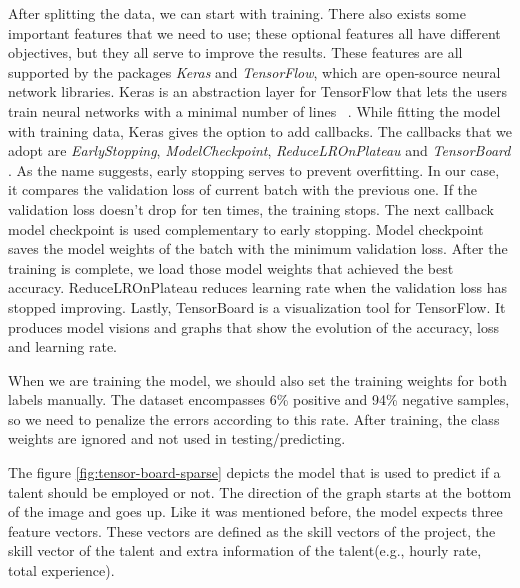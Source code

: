 After splitting the data, we can start with training. There also exists some important features that we need to use; these optional features all have different objectives, but they all serve to improve the results. These features are all supported by the packages \textit{Keras} and \textit{TensorFlow}, which are open-source neural network libraries. Keras is an abstraction layer for TensorFlow that lets the users train neural networks with a minimal number of lines ~\parencite{chollet2018deep}. While fitting the model with training data, Keras gives the option to add callbacks. The callbacks that we adopt are \textit{EarlyStopping}, \textit{ModelCheckpoint},  \textit{ReduceLROnPlateau} and \textit{TensorBoard} . As the name suggests, early stopping serves to prevent overfitting. In our case, it compares the validation loss of current batch with the previous one. If the validation loss doesn't drop for ten times, the training stops. The next callback model checkpoint is used complementary to early stopping. Model checkpoint saves the model weights of the batch with the minimum validation loss. After the training is complete, we load those model weights that achieved the best accuracy. ReduceLROnPlateau reduces learning rate when the validation loss has stopped improving. Lastly, TensorBoard is a visualization tool for TensorFlow. It produces model visions and graphs that show the evolution of the accuracy, loss and learning rate. 

When we are training the model, we should also set the training weights for both labels manually. The dataset encompasses 6\% positive and 94\% negative samples, so we need to penalize the errors according to this rate. After training, the class weights are ignored and not used in testing/predicting.


The figure \ref{fig:tensor-board-sparse}  depicts the model that is used to predict if a talent should be employed or not. The direction of the graph starts at the bottom of the image and goes up. Like it was mentioned before, the model expects three feature vectors. These vectors are defined as the skill vectors of the project, the skill vector of the talent and extra information of the talent(e.g., hourly rate, total experience). 

